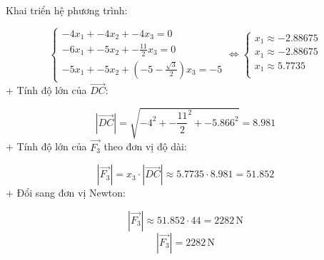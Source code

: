 \documentclass[a4paper,12pt]{article}
\begin{document}
Khai triển hệ phương trình:


\[
\begin{cases}
-4x_1 + -4x_2 + -4x_3 = 0 \\
-6x_1 + -5x_2 + - \frac{11}{2}x_3 = 0 \\
-5x_1 + -5x_2 + \left(-5 - \frac{\sqrt{3}}{2}\right)x_3 = -5
\end{cases}
\Leftrightarrow
\begin{cases}
x_1 \approx -2.88675 \\
x_1 \approx -2.88675 \\
x_1 \approx 5.7735 \\
\end{cases}
\]
+ Tính độ lớn của \(\overrightarrow{DC}\):


\[ |\overrightarrow{DC}| = \sqrt{-4^2 + - \frac{11}{2}^2 + -5.866^2} = 8.981 \]
+ Tính độ lớn của \(\overrightarrow{F_3}\) theo đơn vị độ dài:


\[ |\overrightarrow{F_3}| = x_3 \cdot |\overrightarrow{DC}| \approx 5.7735 \cdot 8.981 = 51.852 \]
+ Đổi sang đơn vị Newton:


\[ |\overrightarrow{F_3}| \approx 51.852 \cdot 44 = 2282\,\mathrm{N} \]
\[|\overrightarrow{F_3}| = 2282\,\mathrm{N}\]
\end{document}
